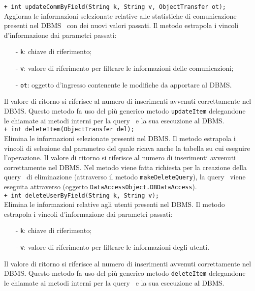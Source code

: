 {\begin{sloppypar}
{{{{\begin{itemize}
{				\texttt{+ int updateCommByField(String k, String v, ObjectTransfer ot);}\\
				Aggiorna le informazioni selezionate relative alle statistiche di comunicazione presenti nel DBMS\g~ con dei nuovi valori passati.
				Il metodo estrapola i vincoli d'informazione dai parametri passati:
				\begin{itemize}
					\item[-] \texttt{k}: chiave di riferimento;
					\item[-] \texttt{v}: valore di riferimento per filtrare le informazioni delle comunicazioni;
					\item[-] \texttt{ot}: oggetto d'ingresso contenente le modifiche da apportare al DBMS\g.
				\end{itemize}
				Il valore  di ritorno si riferisce al numero di inserimenti avvenuti correttamente nel DBMS\g.
				Questo metodo fa uso del più generico metodo \texttt{updateItem} delegandone le chiamate ai metodi interni per la query\g~ e la sua esecuzione al DBMS\g.\\
				
				\texttt{+ int deleteItem(ObjectTransfer del);}\\
				Elimina le informazioni selezionate presenti nel DBMS\g.
				Il metodo estrapola i vincoli di selezione dal parametro del quale ricava anche la tabella su cui eseguire l'operazione.
				Il valore  di ritorno si riferisce al numero di inserimenti avvenuti correttamente nel DBMS\g.
				Nel metodo viene fatta richiesta per la creazione della query\g~ di eliminazione (attraverso il metodo  \texttt{makeDeleteQuery}), la query\g~ viene eseguita attraverso (oggetto \texttt{DataAccessObject.DBDataAccess}).\\
				
				\texttt{+ int deleteUserByField(String k, String v);}\\
				Elimina le informazioni relative agli utenti presenti nel DBMS\g.
				Il metodo estrapola i vincoli d'informazione dai parametri passati:
				\begin{itemize}
					\item[-] \texttt{k}: chiave di riferimento;
					\item[-] \texttt{v}: valore di riferimento per filtrare le informazioni degli utenti.
				\end{itemize}
				Il valore  di ritorno si riferisce al numero di inserimenti avvenuti correttamente nel DBMS\g.
				Questo metodo fa uso del più generico metodo \texttt{deleteItem} delegandone le chiamate ai metodi interni per la query\g~ e la sua esecuzione al DBMS\g.\\
				
}
\end{itemize}}}}}
\end{sloppypar}}
